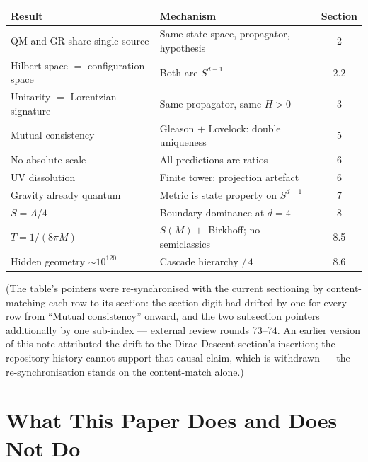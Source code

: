 \documentclass[12pt,a4paper]{article}
\begin{document}
\begin{center}
\small
\begin{tabular}{llc}
\hline
Result & Mechanism & Section \\
\hline
QM and GR share single source & Same state space, propagator, hypothesis & 2 \\
Hilbert space $=$ configuration space & Both are $S^{d-1}$ & 2.2 \\
Unitarity $=$ Lorentzian signature & Same propagator, same $H > 0$ & 3 \\
Mutual consistency & Gleason $+$ Lovelock: double uniqueness & 5 \\
No absolute scale & All predictions are ratios & 6 \\
UV dissolution & Finite tower; projection artefact & 6 \\
Gravity already quantum & Metric is state property on $S^{d-1}$ & 7 \\
$S = A/4$ & Boundary dominance at $d = 4$ & 8 \\
$T = 1/(8\pi M)$ & $S(M) + $ Birkhoff; no semiclassics & 8.5 \\
Hidden geometry $\sim 10^{120}$ & Cascade hierarchy $/\, 4$ & 8.6 \\
\hline
\end{tabular}
\end{center}

\noindent(The table's pointers were re-synchronised with the current
sectioning by content-matching each row to its section: the section
digit had drifted by one for every row from ``Mutual consistency''
onward, and the two subsection pointers additionally by one sub-index
--- external review rounds 73--74. An earlier version of this note
attributed the drift to the Dirac Descent section's insertion; the
repository history cannot support that causal claim, which is
withdrawn --- the re-synchronisation stands on the content-match
alone.)

\section{What This Paper Does and Does Not Do}\label{sec:what-this-paper-does-and-does-not-do}
\end{document}
